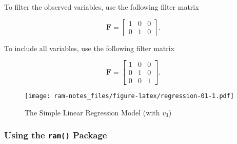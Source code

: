 \documentclass[
]{book}
\newenvironment{Shaded}{\begin{snugshade}}{\end{snugshade}}
\newcommand{\AttributeTok}[1]{\textcolor[rgb]{0.77,0.63,0.00}{#1}}
\newcommand{\ConstantTok}[1]{\textcolor[rgb]{0.00,0.00,0.00}{#1}}
\newcommand{\FunctionTok}[1]{\textcolor[rgb]{0.00,0.00,0.00}{#1}}
\newcommand{\NormalTok}[1]{#1}
\newcommand{\SpecialCharTok}[1]{\textcolor[rgb]{0.00,0.00,0.00}{#1}}
\newcommand{\StringTok}[1]{\textcolor[rgb]{0.31,0.60,0.02}{#1}}
\begin{document}
To filter the observed variables, use the following filter matrix

\begin{equation}
  \mathbf{F}
  =
  \begin{bmatrix}
    1 & 0 & 0 \\
    0 & 1 & 0
  \end{bmatrix} .
\end{equation}

To include all variables, use the following filter matrix

\begin{equation}
  \mathbf{F}
  =
  \begin{bmatrix}
    1 & 0 & 0 \\
    0 & 1 & 0 \\
    0 & 0 & 1
  \end{bmatrix} .
\end{equation}

\begin{figure}
\centering
\texttt{[image: ram-notes\_files/figure-latex/regression-01-1.pdf]}
\caption{\label{fig:regression-01}The Simple Linear Regression Model (with \(v_3\))}
\end{figure}

\hypertarget{using-the-ram-package}{%
\subsubsection{\texorpdfstring{Using the \texttt{ram()} Package}{Using the ram() Package}}\label{using-the-ram-package}}

\begin{Shaded}
\end{Shaded}
\end{document}
